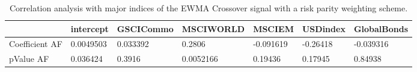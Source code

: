 \begin{table}[H]
\centering
\begin{tabular}{lllllll}
\hline& intercept & GSCICommo & MSCIWORLD & MSCIEM & USDindex & GlobalBonds \\ 
\hline 
Coefficient AF & 0.0049503 & 0.033392 & 0.2806 & -0.091619 & -0.26418 & -0.039316 \\ 
pValue AF & 0.036424 & 0.3916 & 0.0052166 & 0.19436 & 0.17945 & 0.84938 \\ 
\hline
\end{tabular}
\caption{Correlation analysis with major indices of the EWMA Crossover signal with a risk parity weighting scheme.}
\label{MBBSRPOQ_AFACTOR}
\end{table}